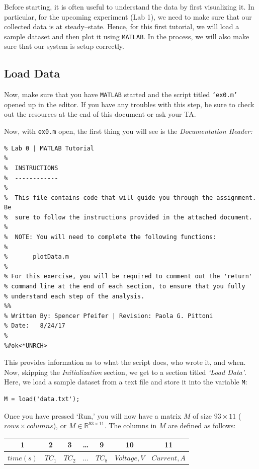 \documentclass[11pt, letterpaper]{article}
\begin{document}
Before starting, it is often useful to understand the data by first visualizing it. In particular, for the upcoming experiment (Lab 1), we need to make sure that our collected data is at steady--state. Hence, for this first tutorial, we will load a sample dataset and then plot it using \texttt{MATLAB}. In the process, we will also make sure that our system is setup correctly.

\subsection{Load Data}
Now, make sure that you have \texttt{MATLAB} started and the script titled \texttt{`ex0.m'} opened up in the editor. If you have any troubles with this step, be sure to check out the resources at the end of this document or ask your TA.

\n
Now, with \texttt{ex0.m} open, the first thing you will see is the \textit{Documentation Header:}

\n
\begin{lstlisting}[numbers=none]
%% ME 436L Heat Transfer
% Lab 0 | MATLAB Tutorial
%
%  INSTRUCTIONS
%  ------------
%
%  This file contains code that will guide you through the assignment. Be 
%  sure to follow the instructions provided in the attached document.
%
%  NOTE: You will need to complete the following functions:
%
%       plotData.m
%
% For this exercise, you will be required to comment out the 'return'
% command line at the end of each section, to ensure that you fully
% understand each step of the analysis.
%%
% Written By: Spencer Pfeifer | Revision: Paola G. Pittoni
% Date:   8/24/17
%
%#ok<*UNRCH>
\end{lstlisting}
\n
This provides information as to what the script does, who wrote it, and when. Now, skipping the \textit{Initialization} section, we get to a section titled \textit{`Load Data'}. Here, we load a sample dataset from a text file and store it into the variable \texttt{M}:
\n
\begin{lstlisting}[numbers=none]
% load tab separated data
M = load('data.txt'); 
\end{lstlisting}
\n

Once you have pressed `Run,' you will now have a matrix $M$ of size $93 \times 11$ ($rows \times columns$), or $M \in \mathbb{R}^{93 \times 11}$. The columns in $M$ are defined as follows:
\\
{\small
\begin{center}\renewcommand{\arraystretch}{1.5}
\begin{tabular}{|c | c | c | c | c | c | c |}
\hline
\rowcolor{light-gray}
    1 & 2 & 3 & \dots & 9 & 10 & 11 \\ 
    \hline
   \cellcolor{green!10} $time (s)$ & \cellcolor{red!10}$TC_1$ & \cellcolor{red!10}$TC_2$ & \cellcolor{red!10}$\dots$ & \cellcolor{red!10}$TC_8$ & \cellcolor{orange!10}$Voltage, V$ & \cellcolor{orange!10}$Current, A$ \\ 
\hline
\end{tabular}
\end{center}
}
\end{document}
